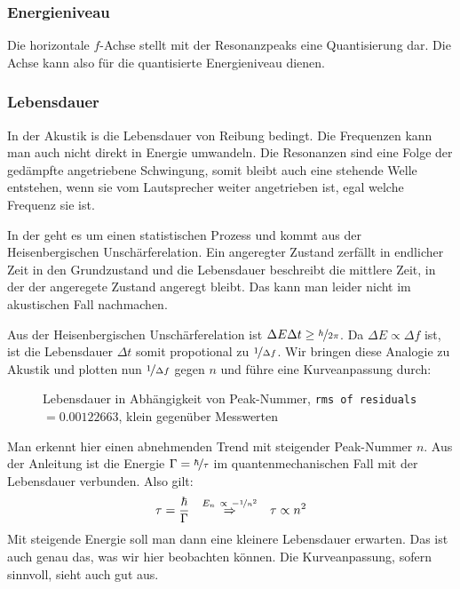 		\subsubsection{Energieniveau}
			Die horizontale $f$-Achse stellt mit der Resonanzpeaks eine Quantisierung dar. Die Achse kann also für die quantisierte Energieniveau dienen.

		\subsubsection{Lebensdauer}
			In der Akustik is die Lebensdauer von Reibung bedingt. Die Frequenzen kann man auch nicht direkt in Energie umwandeln. Die Resonanzen sind eine Folge der gedämpfte angetriebene Schwingung, somit bleibt auch eine stehende Welle entstehen, wenn sie vom Lautsprecher weiter angetrieben ist, egal welche Frequenz sie ist. 

			In der \qm{} geht es um einen statistischen Prozess und kommt aus der Heisenbergischen Unschärferelation. Ein angeregter Zustand zerfällt in endlicher Zeit in den Grundzustand und die Lebensdauer beschreibt die mittlere Zeit, in der der angeregete Zustand angeregt bleibt. Das kann man leider nicht im akustischen Fall nachmachen.

			Aus der Heisenbergischen Unschärferelation ist $\Delta E \Delta t \geq \nicefrac{h}{2\pi}$. Da $\Delta E \propto \Delta f$ ist, ist die Lebensdauer $\Delta t$ somit propotional zu $\nicefrac{1}{\Delta f}$. Wir bringen diese Analogie zu Akustik und plotten nun $\nicefrac{1}{\Delta f}$ gegen $n$ und führe eine Kurveanpassung durch:
			\begin{figure}[!ht]
			    \centering
			    \vspace{-1em}
			    \resizebox{.9\textwidth}{!}{}
			    \caption{Lebensdauer in Abhängigkeit von Peak-Nummer, \texttt{rms of residuals} $=\num{0.00122663}$, klein gegenüber Messwerten}
			    \label{fig:tv1-2}
			    \vspace{-1em}
			\end{figure}
			
			Man erkennt hier einen abnehmenden Trend mit steigender Peak-Nummer $n$. Aus der Anleitung ist die Energie $\Gamma = \nicefrac{\hbar}{\tau}$ im quantenmechanischen Fall mit der Lebensdauer verbunden. Also gilt:
			\begin{align}
				\tau = \frac{\hbar}{\Gamma} &&\overset{E_n ~\propto~ -\nicefrac{1}{n^2}}{\Rightarrow}&& \tau \propto n^2
			\end{align}
			Mit steigende Energie soll man dann eine kleinere Lebensdauer erwarten. Das ist auch genau das, was wir hier beobachten können. Die Kurveanpassung, sofern sinnvoll, sieht auch gut aus. 

